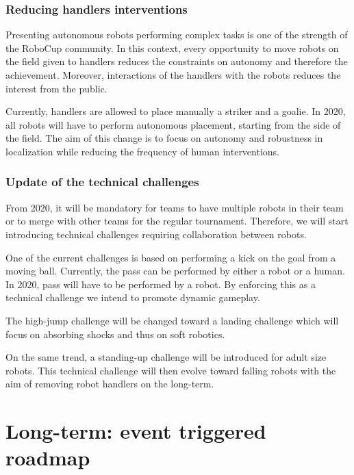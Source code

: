 \documentclass{article}
\begin{document}
\subsubsection{Reducing handlers interventions}
Presenting autonomous robots performing complex tasks is one of the strength of
the RoboCup community.
In this context, every opportunity to move robots on the field given to handlers
reduces the constraints on autonomy and therefore the achievement.
Moreover, interactions of the handlers with the robots reduces the interest from
the public.

Currently, handlers are allowed to place manually a striker and a goalie.
In 2020, all robots will have to perform autonomous placement,
starting from the side of the field.
The aim of this change is to focus on autonomy and robustness in localization
while reducing the frequency of human interventions.

\subsubsection{Update of the technical challenges}

From 2020, it will be mandatory for teams to have multiple robots in their team
or to merge with other teams for the regular tournament.
Therefore, we will start introducing technical challenges requiring collaboration between robots.

One of the current challenges is based on performing a kick on the goal from a moving ball.
Currently, the pass can be performed by either a robot or a human.
In 2020, pass will have to be performed by a robot.
By enforcing this as a technical challenge we intend to promote dynamic gameplay.

The high-jump challenge will be changed toward a landing challenge which will
focus on absorbing shocks and thus on soft robotics.

On the same trend, a standing-up challenge will be introduced for adult size robots.
This technical challenge will then evolve toward falling robots with the aim of removing
robot handlers on the long-term.


\section{\label{sec:LongTerm}Long-term: event triggered roadmap}

\end{document}
